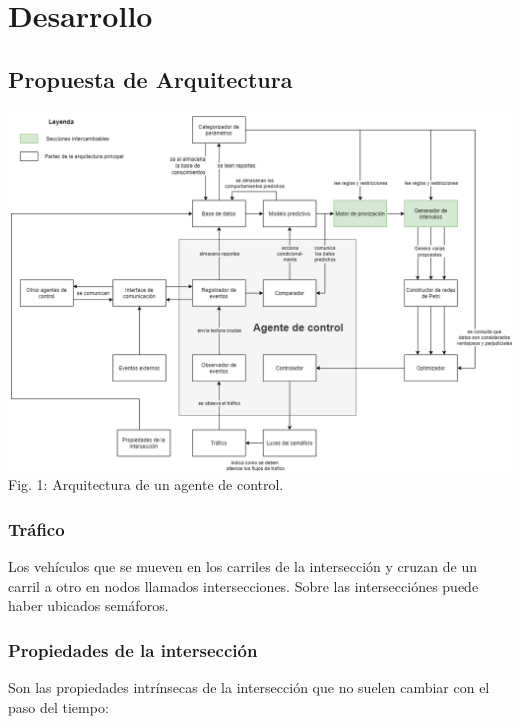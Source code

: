 
\chapter{Desarrollo} %
\graphicspath{{./../imagenes/}}
\linespread{1.3}
\hypertarget{propuesta-de-arquitectura}{%
\section{Propuesta de Arquitectura}\label{propuesta-de-arquitectura}}

\includegraphics[width=\textwidth]{arquitectura.png} Fig. 1:
Arquitectura de un agente de control.

\hypertarget{truxe1fico}{%
\subsection{Tráfico}\label{truxe1fico}}

Los vehículos que se mueven en los carriles de la intersección y cruzan
de un carril a otro en nodos llamados intersecciones. Sobre las
intersecciónes puede haber ubicados semáforos.

\hypertarget{propiedades-de-la-intersecciuxf3n}{%
\subsection{Propiedades de la
intersección}\label{propiedades-de-la-intersecciuxf3n}}

Son las propiedades intrínsecas de la intersección que no suelen cambiar
con el paso del tiempo:

